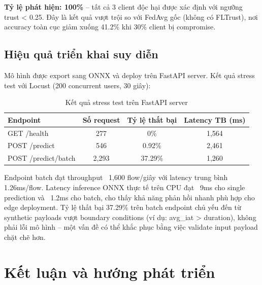 \documentclass[12pt,a4paper]{article}
\begin{document}
\textbf{Tỷ lệ phát hiện: 100\%} -- tất cả 3 client độc hại được xác định với ngưỡng trust < 0.25. Đây là kết quả vượt trội so với FedAvg gốc (không có FLTrust), nơi accuracy toàn cục giảm xuống 41.2\% khi 30\% client bị compromise.

\subsection{Hiệu quả triển khai suy diễn}

Mô hình được export sang ONNX và deploy trên FastAPI server. Kết quả stress test với Locust (200 concurrent users, 30 giây):

\begin{table}[h]
\centering
\caption{Kết quả stress test trên FastAPI server}
\begin{tabular}{|l|c|c|c|}
\hline
\textbf{Endpoint} & \textbf{Số request} & \textbf{Tỷ lệ thất bại} & \textbf{Latency TB (ms)} \\ \hline
GET /health & 277 & 0\% & 1,564 \\ \hline
POST /predict & 546 & 0.92\% & 2,461 \\ \hline
POST /predict/batch & 2,293 & 37.29\% & 1,260 \\ \hline
\end{tabular}
\end{table}

Endpoint batch đạt throughput ~1,600 flow/giây với latency trung bình 1.26ms/flow. Latency inference ONNX thực tế trên CPU đạt ~9ms cho single prediction và ~1.2ms cho batch, cho thấy khả năng phản hồi nhanh phù hợp cho edge deployment. Tỷ lệ thất bại 37.29\% trên batch endpoint chủ yếu đến từ synthetic payloads vượt boundary conditions (ví dụ: avg\_iat > duration), không phải lỗi mô hình -- một vấn đề có thể khắc phục bằng việc validate input payload chặt chẽ hơn.

\section{Kết luận và hướng phát triển}
\end{document}
